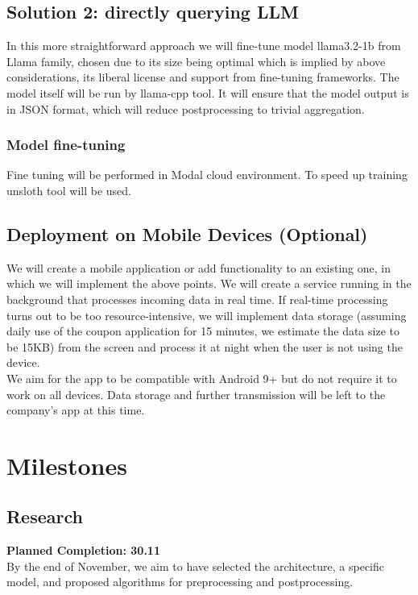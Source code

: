\documentclass[12pt]{article}
\begin{document}
\subsection*{Solution 2: directly querying LLM}
In this more straightforward approach we will fine-tune model llama3.2-1b from Llama family\cite{llama32-1b}, chosen due to its size being optimal which is implied by above considerations, its liberal license and support from fine-tuning frameworks\cite{unsloth}. The model itself will be run by llama-cpp\cite{llamacpp}\cite{LLMmobile2024} tool. It will ensure that the model output is in JSON format, which will reduce postprocessing to trivial aggregation.
\subsubsection*{Model fine-tuning}
Fine tuning will be performed in Modal\cite{modal} cloud environment. To speed up training unsloth\cite{unsloth} tool will be used.

\subsection*{Deployment on Mobile Devices (Optional)}
We will create a mobile application or add functionality to an existing one, in which we will implement the above points. We will create a service running in the background that processes incoming data in real time. If real-time processing turns out to be too resource-intensive, we will implement data storage (assuming daily use of the coupon application for 15 minutes, we estimate the data size to be 15KB) from the screen and process it at night when the user is not using the device.\\

We aim for the app to be compatible with Android 9+ but do not require it to work on all devices. Data storage and further transmission will be left to the company's app at this time.

\section*{Milestones}

\subsection*{Research}
\textbf{Planned Completion: 30.11}\\
By the end of November, we aim to have selected the architecture, a specific model, and proposed algorithms for preprocessing and postprocessing.
\end{document}
